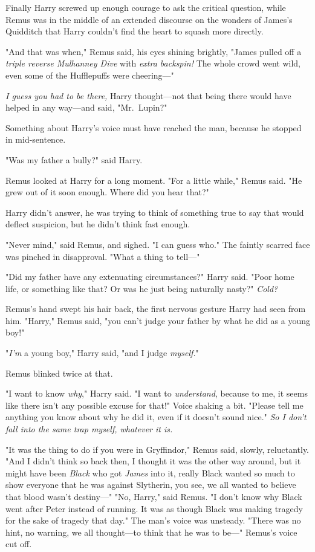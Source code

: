 Finally Harry screwed up enough courage to ask the critical question, while
Remus was in the middle of an extended discourse on the wonders of James's
Quidditch that Harry couldn't find the heart to squash more directly.

"And that was when," Remus said, his eyes shining brightly, "James pulled off a
\emph{triple reverse Mulhanney Dive} with \emph{extra backspin!} The whole
crowd went wild, even some of the Hufflepuffs were cheering---"

\emph{I guess you had to be there,} Harry thought---not that being there would
have helped in any way---and said, "Mr.~Lupin?"

Something about Harry's voice must have reached the man, because he stopped in
mid-sentence.

"Was my father a bully?" said Harry.

Remus looked at Harry for a long moment. "For a little while," Remus said. "He
grew out of it soon enough. Where did you hear that?"

Harry didn't answer, he was trying to think of something true to say that would
deflect suspicion, but he didn't think fast enough.

"Never mind," said Remus, and sighed. "I can guess who." The faintly scarred
face was pinched in disapproval. "What a thing to tell---"

"Did my father have any extenuating circumstances?" Harry said. "Poor home
life, or something like that? Or was he just{\el} being naturally
nasty?" \emph{Cold?}

Remus's hand swept his hair back, the first nervous gesture Harry had seen from
him. "Harry," Remus said, "you can't judge your father by what he did as a
young boy!"

"\emph{I'm} a young boy," Harry said, "and I judge \emph{myself.}"

Remus blinked twice at that.

"I want to know \emph{why}," Harry said. "I want to \emph{understand}, because
to me, it seems like there isn't any possible excuse for that!" Voice shaking a
bit. "Please tell me anything you know about why he did it, even if it doesn't
sound nice."  \emph{So I don't fall into the same trap myself, whatever it is.}

"It was the thing to do if you were in Gryffindor," Remus said, slowly,
reluctantly. "And{\el} I didn't think so back then, I thought it was the
other way around, but{\el} it might have been \emph{Black} who got
\emph{James} into it, really{\el} Black wanted so much to show everyone that
he was against Slytherin, you see, we all wanted to believe that blood wasn't
destiny---"
\sbreak
"No, Harry," said Remus. "I don't know why Black went after Peter instead of
running. It was as though Black was making tragedy for the sake of tragedy that
day." The man's voice was unsteady. "There was no hint, no warning, we all
thought---to think that he was to be---" Remus's voice cut off.

